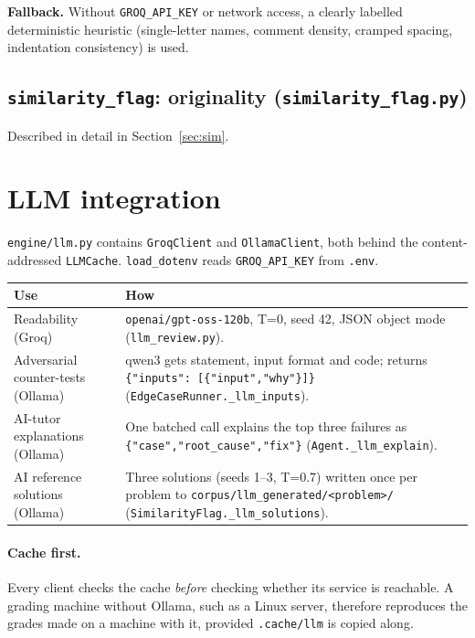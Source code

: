 \documentclass[11pt,a4paper]{article}
\newcommand{\file}[1]{\nolinkurl{#1}}
\newcommand{\fn}[1]{\nolinkurl{#1}}
\begin{document}
\textbf{Fallback.} Without \texttt{GROQ\_API\_KEY} or network access, a clearly labelled deterministic heuristic
(single-letter names, comment density, cramped spacing, indentation consistency) is used.

\subsection{\texttt{similarity\_flag}: originality (\texttt{similarity\_flag.py})}
Described in detail in Section~\ref{sec:sim}.

\section{LLM integration}\label{sec:llm}
\file{engine/llm.py} contains \fn{GroqClient} and \fn{OllamaClient}, both behind the content-addressed
\fn{LLMCache}. \fn{load_dotenv} reads \texttt{GROQ\_API\_KEY} from \file{.env}.

\noindent\begin{tabularx}{\textwidth}{@{}>{\raggedright\arraybackslash}p{3.7cm}L@{}}
\toprule
\textbf{Use} & \textbf{How} \\
\midrule
Readability (Groq) & \texttt{openai/gpt-oss-120b}, T=0, seed 42, JSON object mode (\file{llm_review.py}). \\
Adversarial counter-tests (Ollama) & qwen3 gets statement, input format and code; returns \texttt{\{"inputs": [\{"input","why"\}]\}} (\fn{EdgeCaseRunner._llm_inputs}). \\
AI-tutor explanations (Ollama) & One batched call explains the top three failures as \texttt{\{"case","root\_cause","fix"\}} (\fn{Agent._llm_explain}). \\
AI reference solutions (Ollama) & Three solutions (seeds 1--3, T=0.7) written once per problem to \file{corpus/llm_generated/<problem>/} (\fn{SimilarityFlag._llm_solutions}). \\
\bottomrule
\end{tabularx}

\paragraph{Cache first.} Every client checks the cache \emph{before} checking whether its service is reachable.
A grading machine without Ollama, such as a Linux server, therefore reproduces the grades made on a machine with
it, provided \file{.cache/llm} is copied along.
\end{document}
